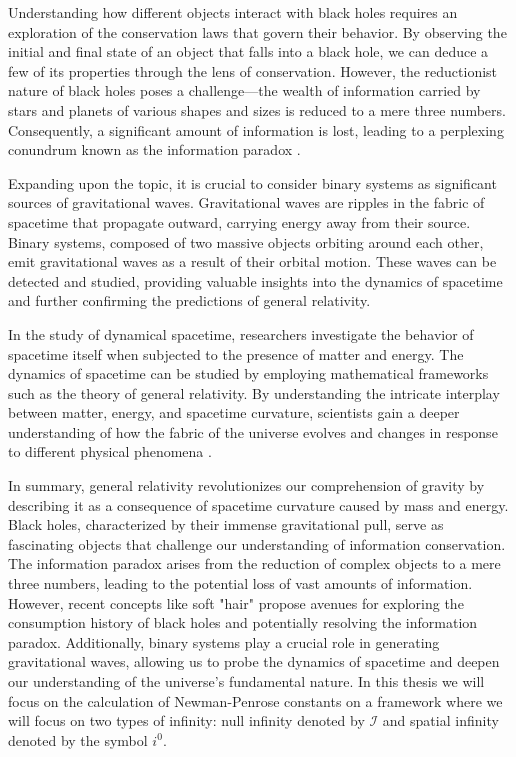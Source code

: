 Understanding how different objects interact with black holes requires an exploration of the conservation laws that govern their behavior. By observing the initial and final state of an object that falls into a black hole, we can deduce a few of its properties through the lens of conservation. However, the reductionist nature of black holes poses a challenge—the wealth of information carried by stars and planets of various shapes and sizes is reduced to a mere three numbers. Consequently, a significant amount of information is lost, leading to a perplexing conundrum known as the information paradox \cite{HawMalStr16}. 

Expanding upon the topic, it is crucial to consider binary systems as significant sources of gravitational waves. Gravitational waves are ripples in the fabric of spacetime that propagate outward, carrying energy away from their source. Binary systems, composed of two massive objects orbiting around each other, emit gravitational waves as a result of their orbital motion. These waves can be detected and studied, providing valuable insights into the dynamics of spacetime and further confirming the predictions of general relativity. 

In the study of dynamical spacetime, researchers investigate the behavior of spacetime itself when subjected to the presence of matter and energy. The dynamics of spacetime can be studied by employing mathematical frameworks such as the theory of general relativity. By understanding the intricate interplay between matter, energy, and spacetime curvature, scientists gain a deeper understanding of how the fabric of the universe evolves and changes in response to different physical phenomena \cite{DaiVal02}. 

In summary, general relativity revolutionizes our comprehension of gravity by describing it as a consequence of spacetime curvature caused by mass and energy. Black holes, characterized by their immense gravitational pull, serve as fascinating objects that challenge our understanding of information conservation. The information paradox arises from the reduction of complex objects to a mere three numbers, leading to the potential loss of vast amounts of information. However, recent concepts like soft "hair" propose avenues for exploring the consumption history of black holes and potentially resolving the information paradox. Additionally, binary systems play a crucial role in generating gravitational waves, allowing us to probe the dynamics of spacetime and deepen our understanding of the universe's fundamental nature. In this thesis we will focus on the calculation of Newman-Penrose constants on a framework where we will focus on two types of infinity: null infinity denoted by $\mathscr{I}$ and spatial infinity denoted by the symbol $i^0$.


